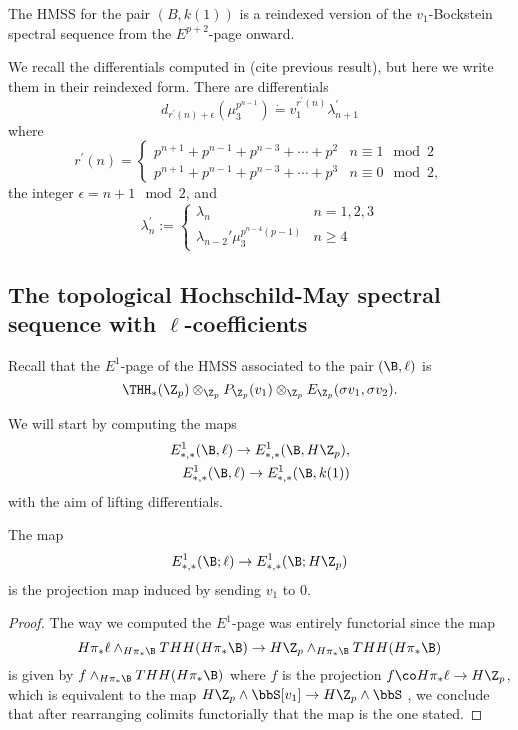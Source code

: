 \begin{cor}
	The HMSS for the pair $(B,k(1))$ is a reindexed version of the $v_1$-Bockstein spectral sequence from the $E^{p+2}$-page onward. 
\end{cor}

We recall the differentials computed in (cite previous result), but here we write them in their reindexed form. There are differentials 
\[ d_{r^{\prime}(n)+\epsilon}(\mu_3^{p^{n-1}})\dot{=}v_1^{r^{\prime}(n)}\lambda_{n+1}^{\prime}\]
where 
\[ r^{\prime}(n)=
	\begin{cases} 
		p^{n+1}+p^{n-1}+p^{n-3}+\cdots+p^2 & n\equiv 1\mod 2 \\ 
		p^{n+1}+p^{n-1}+p^{n-3}+\cdots+p^3 & n\equiv 0\mod 2, 
	\end{cases}
\]
the integer $\epsilon=n+1\mod 2$, and 
\[
\lambda_n^{\prime}:= \begin{cases}
	\lambda_n & n=1,2,3\\
	\lambda_{n-2}'\mu_3^{p^{n-4}(p-1)} & n\geq 4
\end{cases}
\]


\subsection{The topological Hochschild-May spectral sequence with $\ell$-coefficients}

Recall that the $E^1$-page of the HMSS associated to the pair $(\B,\ell)$ is 
\[  \THH_*(\Z_p)\otimes_{\Z_p}P_{\Z_p}(v_1)\otimes_{\Z_p} E_{\Z_p}(\sigma v_1, \sigma v_2).\]

We will start by computing the maps 
\begin{align}
E_{*,*}^1(\B,\ell)\to E_{*,*}^1(\B,H\Z_p), \\
E_{*,*}^1(\B,\ell)\to E_{*,*}^1(\B,k(1))
\end{align}
with the aim of lifting differentials. 

\begin{prop}
	The map 
	\[
	E_{*,*}^1(\B;\ell)\to E_{*,*}^1(\B;H\Z_p)
	\]
	is the projection map induced by sending $v_1$ to $0$. 
\end{prop}
\begin{proof}
The way we computed the $E^1$-page was entirely functorial since the map 
\[ H\pi_*\ell\wedge_{H\pi_*\B}THH(H\pi_*\B)\to H\Z_p \wedge_{H\pi_*\B}THH(H\pi_*\B)\]
is given by $f\wedge_{H\pi_*\B}THH(H\pi_*\B)$ where $f$ is the projection $f\co H\pi_*\ell\to H\Z_p$, which is equivalent to the map $H\Z_p\wedge \bbS[v_1]\to H\Z_p\wedge \bbS$ , we conclude that after rearranging colimits functorially that the map is the one stated. 
\end{proof}


